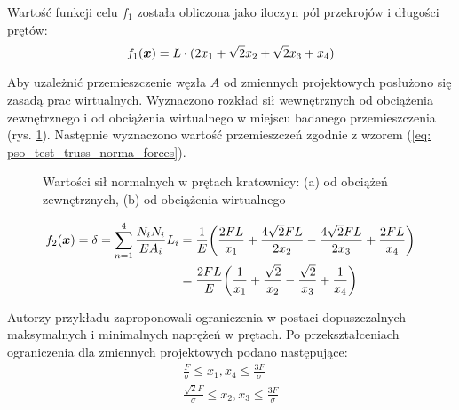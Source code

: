 Wartość funkcji celu $f_1$ została obliczona jako iloczyn pól przekrojów i długości prętów:
\begin{equation}
	f_1(\bm{x}) = L\cdot(2x_1+\sqrt{2}x_2+\sqrt{2}x_3+x_4)
\end{equation}

Aby uzależnić przemieszczenie węzła $A$ od zmiennych projektowych posłużono się zasadą prac wirtualnych. Wyznaczono rozkład sił wewnętrznych od obciążenia zewnętrznego i od obciążenia wirtualnego w miejscu badanego przemieszczenia (rys. \ref{fig: pso_testtruss_results}). Następnie wyznaczono wartość przemieszczeń zgodnie z wzorem (\ref{eq: pso_test_truss_norma_forces}).

\begin{figure}[hbt!]
	\centering
	\captionsetup{justification=centering}
	\caption{Wartości sił normalnych w prętach kratownicy: (a) od obciążeń zewnętrznych, (b) od obciążenia wirtualnego}
	\label{fig: pso_testtruss_results}
\end{figure}

\begin{equation} \label{eq: pso_test_truss_norma_forces}
\begin{split}
	f_2(\bm{x}) =\delta= \sum_{n=1}^{4} \frac{N_i\bar{N}_i}{EA_i}L_i &=\frac{1}{E}\bigg(\frac{2FL}{x_1}+ \frac{4\sqrt{2}FL}{2x_2}- \frac{4\sqrt{2}FL}{2x_3}+\frac{2FL}{x_4}\bigg) \\
	&=\frac{2FL}{E}\bigg(\frac{1}{x_1}+\frac{\sqrt{2}}{x_2}-\frac{\sqrt{2}}{x_3}+\frac{1}{x_4}\bigg)
\end{split}
\end{equation}

\pagebreak[4]
Autorzy przykładu zaproponowali ograniczenia w postaci dopuszczalnych maksymalnych i minimalnych naprężeń w prętach. Po przekształceniach ograniczenia dla zmiennych projektowych podano następujące:
\begin{equation}
	\begin{split}
	\frac{F}{\sigma} \le x_1,x_4 \le \frac{3F}{\sigma}\\
	\frac{\sqrt{2}F}{\sigma} \le x_2,x_3 \le \frac{3F}{\sigma}
	\end{split}
\end{equation}


